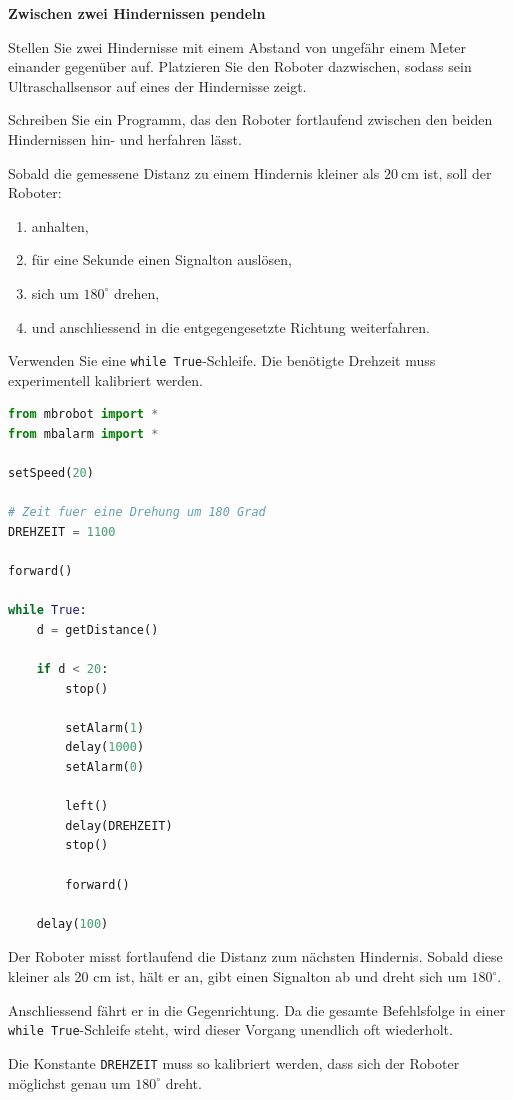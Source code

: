 \begin{myexercise}
    \textbf{Zwischen zwei Hindernissen pendeln}

    Stellen Sie zwei Hindernisse mit einem Abstand von
    ungefähr einem Meter einander gegenüber auf.
    Platzieren Sie den Roboter dazwischen, sodass
    sein Ultraschallsensor auf eines der Hindernisse zeigt.

    Schreiben Sie ein Programm, das den Roboter
    fortlaufend zwischen den beiden Hindernissen
    hin- und herfahren lässt.

    Sobald die gemessene Distanz zu einem Hindernis
    kleiner als \(\SI{20}{\centi\meter}\) ist,
    soll der Roboter:
    \begin{enumerate}
        \item anhalten,
        \item für eine Sekunde einen Signalton auslösen,
        \item sich um \(180^\circ\) drehen,
        \item und anschliessend in die entgegengesetzte
              Richtung weiterfahren.
    \end{enumerate}

    Verwenden Sie eine \texttt{while True}-Schleife.
    Die benötigte Drehzeit muss experimentell
    kalibriert werden.

    \begin{myanswer}
        \begin{lstlisting}[language=Python]
from mbrobot import *
from mbalarm import *

setSpeed(20)

# Zeit fuer eine Drehung um 180 Grad
DREHZEIT = 1100

forward()

while True:
    d = getDistance()

    if d < 20:
        stop()

        setAlarm(1)
        delay(1000)
        setAlarm(0)

        left()
        delay(DREHZEIT)
        stop()

        forward()

    delay(100)
        \end{lstlisting}

        Der Roboter misst fortlaufend die Distanz zum
        nächsten Hindernis. Sobald diese kleiner als
        20 cm ist, hält er an, gibt einen Signalton
        ab und dreht sich um \(180^\circ\).

        Anschliessend fährt er in die Gegenrichtung.
        Da die gesamte Befehlsfolge in einer
        \texttt{while True}-Schleife steht, wird
        dieser Vorgang unendlich oft wiederholt.

        Die Konstante \texttt{DREHZEIT} muss so
        kalibriert werden, dass sich der Roboter
        möglichst genau um \(180^\circ\) dreht.
    \end{myanswer}
\end{myexercise}


